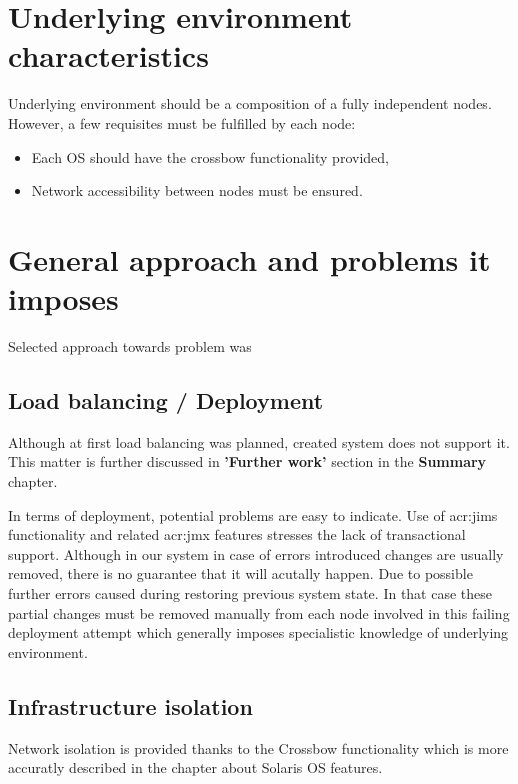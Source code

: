\documentclass[11pt]{book}
\begin{document}
    \section{Underlying environment characteristics}
	
		Underlying environment should be a composition of a fully independent nodes. However, a few requisites
		must be fulfilled by each node:
		
		\begin{itemize}
			\item{Each OS should have the crossbow functionality provided, }
			\item{Network accessibility between nodes must be ensured. }
		\end{itemize}
		

    \section{General approach and problems it imposes}
	
		Selected approach towards problem was 

      \subsection{Load balancing / Deployment}
	  
		Although at first load balancing was planned, created system does not support it. This matter is further 
		discussed in \textbf{'Further work'} section in the \textbf{Summary} chapter.
		
		In terms of deployment, potential problems are easy to indicate. Use of \gls{acr:jims} functionality and related \gls{acr:jmx} 
		features stresses the lack of transactional support. Although in our system in case of errors introduced changes
		are usually removed, there is no guarantee that it will acutally happen. Due to possible further errors caused during 
		restoring previous system state. In that case these partial changes must be removed manually from each node
		involved in this failing deployment attempt which generally imposes specialistic knowledge of underlying environment. 

      \subsection{Infrastructure isolation}
	  
		Network isolation is provided thanks to the Crossbow functionality which is more accuratly described in the chapter
		about Solaris OS features. 
		
\end{document}
